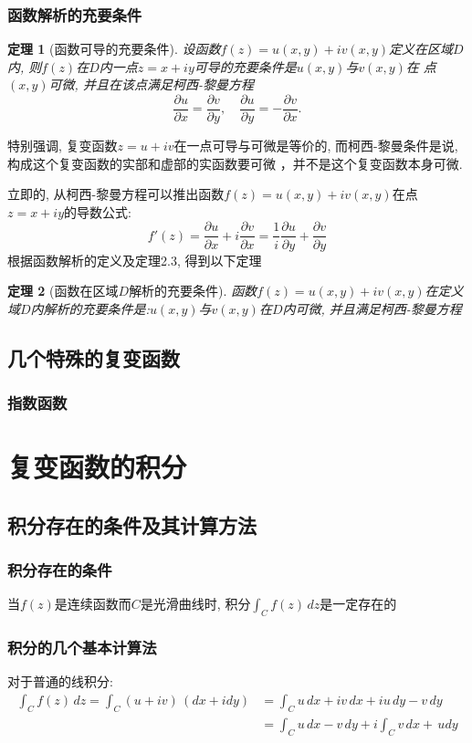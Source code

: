 \documentclass[12pt, a4paper, oneside]{ctexart}
\theoremstyle{plain}
\newtheorem{theorem}{定理}[section]
\theoremstyle{definition}
\theoremstyle{definition}
\begin{document}
\subsubsection{函数解析的充要条件}
\begin{theorem}[函数可导的充要条件]
设函数$f(z)=u(x,y)+iv(x,y)$定义在区域$D$内, 则$f(z)$在$D$内一点$z=x+iy$可导的充要条件是$u(x,y)$与$v(x,y)$在
点$(x,y)$可微, 并且在该点满足柯西-黎曼方程
\[
    \frac{\partial u}{\partial x}=\frac{\partial v}{\partial y}, \quad\frac{\partial u}{\partial y}=
    -\frac{\partial v}{\partial x}.
\]
\end{theorem}
特别强调, 复变函数$z=u+iv$在一点可导与可微是等价的, 而柯西-黎曼条件是说, 构成这个复变函数的实部和虚部的实函数要可微
，并不是这个复变函数本身可微.

立即的, 从柯西-黎曼方程可以推出函数$f(z)=u(x,y)+iv(x,y)$在点$z=x+iy$的导数公式:
\[
    f'(z)=\frac{\partial u}{\partial x}+i\frac{\partial v}{\partial x}=
    \frac{1}{i}\frac{\partial u}{\partial y}+\frac{\partial v}{\partial y}
\]
根据函数解析的定义及定理2.3, 得到以下定理
\begin{theorem}[函数在区域$D$解析的充要条件]
    函数$f(z)=u(x,y)+iv(x,y)$在定义域$D$内解析的充要条件是:$u(x,y)$与$v(x,y)$在$D$内可微, 并且满足柯西-黎曼方程
\end{theorem}
\subsection{几个特殊的复变函数}
\subsubsection{指数函数}
\section{复变函数的积分}
\subsection{积分存在的条件及其计算方法}
\subsubsection{积分存在的条件}
当$f(z)$是连续函数而$C$是光滑曲线时, 积分$\int_{C}f(z)  \,dz $是一定存在的
\subsubsection{积分的几个基本计算法}
对于普通的线积分:
\begin{align*}
    \int_{C}f(z)\,dz=\int_{C}(u+iv)\,(dx+idy) &= \int_{C}u\,dx+iv\,dx+iu\,dy-v\,dy \\
    &= \int_{C}u\,dx-v\,dy+i\int_{C}v\,dx+\,udy
\end{align*}
\end{document}
